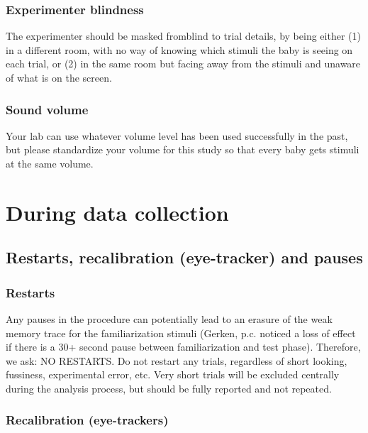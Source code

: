 \documentclass[
  letterpaper,
  DIV=11,
  numbers=noendperiod,
  oneside]{scrreprt}
\begin{document}
\subsection{Experimenter blindness}\label{experimenter-blindness}

The experimenter should be masked fromblind to trial details, by being
either (1) in a different room, with no way of knowing which stimuli the
baby is seeing on each trial, or (2) in the same room but facing away
from the stimuli and unaware of what is on the screen.

\subsection{Sound volume}\label{sound-volume}

Your lab can use whatever volume level has been used successfully in the
past, but please standardize your volume for this study so that every
baby gets stimuli at the same volume.

\chapter{During data collection}\label{sec-duringcollection}

\section{Restarts, recalibration (eye-tracker) and
pauses}\label{restarts-recalibration-eye-tracker-and-pauses}

\subsection{Restarts}\label{restarts}

Any pauses in the procedure can potentially lead to an erasure of the
weak memory trace for the familiarization stimuli (Gerken, p.c. noticed
a loss of effect if there is a 30+ second pause between familiarization
and test phase). Therefore, we ask: NO RESTARTS. Do not restart any
trials, regardless of short looking, fussiness, experimental error, etc.
Very short trials will be excluded centrally during the analysis
process, but should be fully reported and not repeated.

\subsection{Recalibration
(eye-trackers)}\label{recalibration-eye-trackers}
\end{document}

